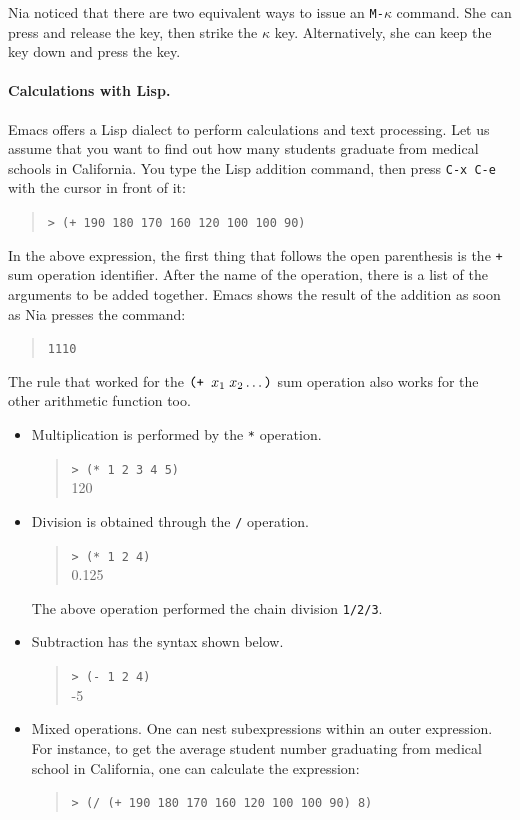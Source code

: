 \documentclass[a4paper,12pt]{book}
\begin{document}
Nia noticed that there are two equivalent ways to
issue an \verb|M-|$\kappa$ command. She can
press and release the  key, then
strike the  $\kappa$ key. Alternatively, she
can keep the  key down and press
the \keys{$\kappa$} key.

\paragraph{Calculations with Lisp.} Emacs
offers a Lisp dialect to perform calculations
and text processing. Let us assume that you
want to find out how many students graduate from
medical schools in California. You type the Lisp
addition command, then press \verb|C-x C-e| with
the cursor in front of it:
\begin{quote}
\verb|> (+ 190 180 170 160 120 100 100 90)|
\end{quote}
In the above expression, the first thing that follows
the open parenthesis is the \verb|+| sum
operation identifier. After the name of
the operation, there is a list of
the arguments to be added together.
Emacs shows the result of the addition as soon as
Nia presses the  command:
\begin{quote}
\verb|1110|
\end{quote}
The rule that worked for  the $\verb|(+ | x_1\;x_2\ldots\verb|)|$
sum operation also works for the  other arithmetic function too.
\begin{itemize}
  \item{Multiplication} is performed
by the \verb|*| operation.
\begin{quote}
\verb|> (* 1 2 3 4 5)|\\
120
\end{quote}
\item{Division} is obtained through the \verb|/| operation.
\begin{quote}
\verb|> (* 1 2 4)|\\
0.125
\end{quote}
The above operation performed the chain
division \verb|1/2/3|.
\item{Subtraction} has the syntax shown below.
\begin{quote}
\verb|> (- 1 2 4)|\\
-5
\end{quote}
\item Mixed operations. One can nest subexpressions
  within an outer expression. For instance,
  to get the average student number graduating
  from medical school in California, one can
  calculate the expression:
\begin{quote}
\verb|> (/ (+ 190 180 170 160 120 100 100 90) 8)|
\end{quote}

\end{itemize}
\end{document}
